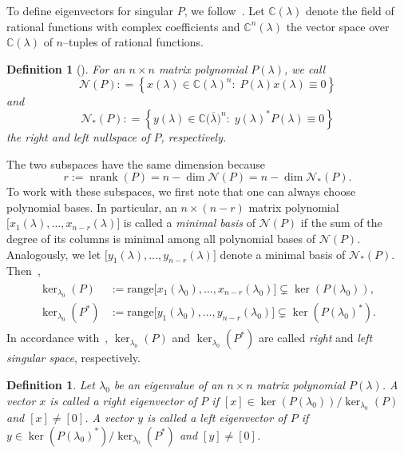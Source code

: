 \documentclass[12pt]{article}
\DeclareMathOperator{\nrank}{nrank}
\newtheorem{definition}[theorem]{Definition}
\begin{document}
To define eigenvectors for singular $P$, we follow~\cite{Dopico2020,lotz2020wilkinson}. Let $\mathbb{C}(\lambda)$ denote the field of rational functions with complex coefficients and $\mathbb{C}^n(\lambda)$ the vector space over $\mathbb{C}(\lambda)$ of $n$--tuples of rational functions.
\begin{definition}[\cite{de2009linearizations}] \label{d:nullspaces}
For an $n\times n$ matrix polynomial $P(\lambda)$, we call 
\[
 \mathcal{N}(P) : = \left\{ x(\lambda) \in \mathbb{C}(\lambda)^n:\; P(\lambda)x(\lambda) \equiv 0 \right\}
\]
and
\[
 \mathcal{N}_*(P) : = \left\{ y(\lambda) \in \mathbb{C}\big(\overline{\lambda}\big)^n:\; y(\lambda)^* P(\lambda) \equiv 0 \right\}
\]
the \emph{right} and \emph{left nullspace} of $P$, respectively.
\end{definition}
The two subspaces have the same dimension because \[ r:=\nrank(P) = n-\dim \mathcal{N}(P) = n-\dim \mathcal{N}_*(P). \]
To work with these subspaces, we first note that one can always choose polynomial bases. In particular, an $n\times (n-r)$ matrix polynomial
$\big[ x_1(\lambda),\ldots,x_{n-r}(\lambda)\big]$ is called a \emph{minimal basis} of $\mathcal{N}(P)$ if the sum of the degree of its columns is minimal among all polynomial bases of $\mathcal{N}(P)$. Analogously, we let 
$\big[ y_1(\lambda),\ldots,y_{n-r}(\lambda)\big]$ denote a minimal basis of $\mathcal{N}_*(P)$.
Then~\cite{Dopico2020},
\begin{align*}
\begin{split}
\ker_{\lambda_0}(P) &:= \mathrm{range} \big[ x_1(\lambda_0),\ldots,x_{n-r}(\lambda_0)\big] \subsetneq \ker(P(\lambda_0)),  \\
    \ker_{\lambda_0}(P^*) &:= \mathrm{range} \big[ y_1(\lambda_0),\ldots,y_{n-r}(\lambda_0)\big] \subsetneq \ker(P(\lambda_0)^*).
\end{split}
\end{align*}
In accordance with~\cite{de2010first}, $\ker_{\lambda_0}(P)$ and $\ker_{\lambda_0}(P^*)$ are called \emph{right} and \emph{left singular space}, respectively.
\begin{definition} \label{def:eigenvector}
 Let $\lambda_0$ be an eigenvalue of an $n\times n$ matrix polynomial $P(\lambda)$. A vector $x$ is called a right eigenvector of $P$ if $[x] \in \ker( P(\lambda_0) )/ \ker_{\lambda_0}(P)$ and $[x] \not=[0]$. 
 A vector $y$ is called a left eigenvector of $P$ if $y \in \ker( P(\lambda_0)^* ) / \ker_{\lambda_0}(P^*)$ and $[y] \not=[0]$. 
\end{definition}
\end{document}
